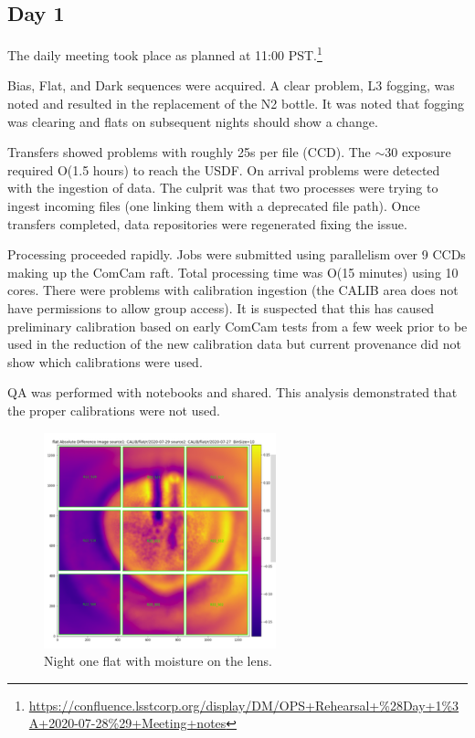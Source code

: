 \subsection{Day 1} \label{sec:day1}

The daily meeting took place as planned at 11:00 PST.\footnote{\url{https://confluence.lsstcorp.org/display/DM/OPS+Rehearsal+\%28Day+1\%3A+2020-07-28\%29+Meeting+notes}}

Bias, Flat, and Dark sequences were acquired.  A clear problem, L3 fogging, was
noted and resulted in the replacement of the N2 bottle.  It was noted that
fogging was clearing and flats on subsequent nights should show a change.

Transfers showed problems with roughly 25s per file (CCD).  The $\sim$30 exposure
required O(1.5 hours) to reach the USDF.  On arrival problems were detected with
the ingestion of data.  The culprit was that two processes were trying to ingest
incoming files (one linking them with a deprecated file path).  Once transfers
completed, data repositories were regenerated fixing the issue.

Processing proceeded rapidly.  Jobs were submitted using parallelism over 9 CCDs
making up the ComCam raft.  Total processing time was O(15 minutes) using 10 cores.
There were problems with calibration ingestion (the CALIB area does not have
permissions to allow group access).  It is suspected that this has caused preliminary
calibration based on early ComCam tests from a few week prior to be used in the
reduction of the new calibration data but current provenance did not show
which calibrations were used.

QA was performed with notebooks  and shared.  This analysis demonstrated that the
proper calibrations were not used.

\begin{figure}
\begin{center}
\includegraphics[width=0.6\textwidth]{figures/n1moist}
\end{center}
\caption{Night one flat with moisture on the lens.\label{fig:d1}}
\end{figure}

